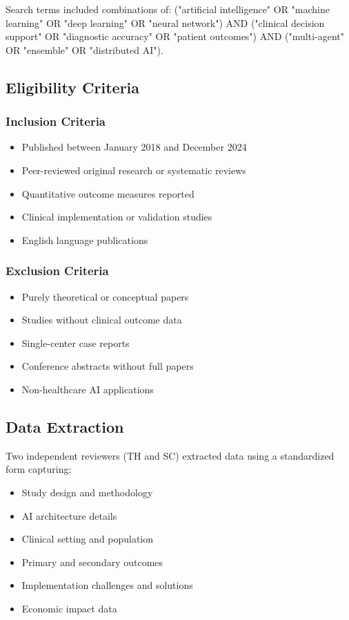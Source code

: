 \documentclass[12pt,letterpaper]{article}
\begin{document}
Search terms included combinations of: ("artificial intelligence" OR "machine learning" OR "deep learning" OR "neural network") AND ("clinical decision support" OR "diagnostic accuracy" OR "patient outcomes") AND ("multi-agent" OR "ensemble" OR "distributed AI").

\subsection{Eligibility Criteria}

\subsubsection{Inclusion Criteria}
\begin{itemize}
\item Published between January 2018 and December 2024
\item Peer-reviewed original research or systematic reviews
\item Quantitative outcome measures reported
\item Clinical implementation or validation studies
\item English language publications
\end{itemize}

\subsubsection{Exclusion Criteria}
\begin{itemize}
\item Purely theoretical or conceptual papers
\item Studies without clinical outcome data
\item Single-center case reports
\item Conference abstracts without full papers
\item Non-healthcare AI applications
\end{itemize}

\subsection{Data Extraction}

Two independent reviewers (TH and SC) extracted data using a standardized form capturing:
\begin{itemize}
\item Study design and methodology
\item AI architecture details
\item Clinical setting and population
\item Primary and secondary outcomes
\item Implementation challenges and solutions
\item Economic impact data
\end{itemize}
\end{document}
